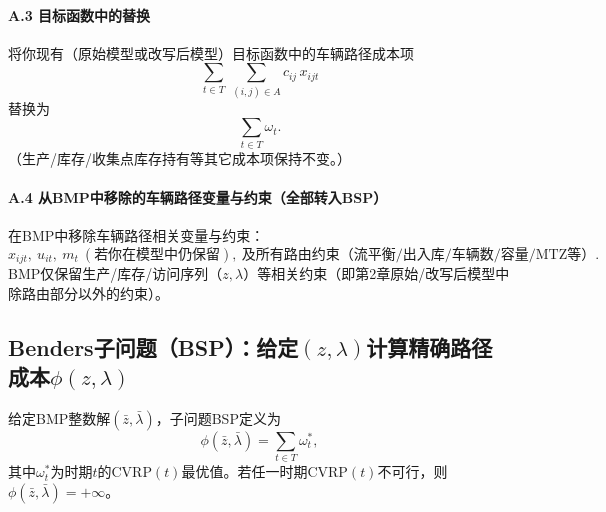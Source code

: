 \documentclass{article}
\begin{document}
\paragraph{A.3 目标函数中的替换}
将你现有（原始模型或改写后模型）目标函数中的车辆路径成本项
\[
\sum_{t\in T}\ \sum_{(i,j)\in A} c_{ij}\,x_{ijt}
\]
替换为
\[
\sum_{t\in T}\omega_t .
\]
（生产/库存/收集点库存持有等其它成本项保持不变。）

\paragraph{A.4 从BMP中移除的车辆路径变量与约束（全部转入BSP）}
在BMP中移除车辆路径相关变量与约束：
\[
x_{ijt},\ u_{it},\ m_t\ (\text{若你在模型中仍保留}),\ \text{及所有路由约束（流平衡/出入库/车辆数/容量/MTZ等）}.
\]
BMP仅保留生产/库存/访问序列（$z,\lambda$）等相关约束（即第2章原始/改写后模型中除路由部分以外的约束）。

\subsection{Benders子问题（BSP）：给定$(z,\lambda)$计算精确路径成本$\phi(z,\lambda)$}

给定BMP整数解$(\bar z,\bar\lambda)$，子问题BSP定义为
\begin{equation}
\phi(\bar z,\bar\lambda)=\sum_{t\in T}\omega_t^*,
\end{equation}
其中$\omega_t^*$为时期$t$的CVRP$(t)$最优值。若任一时期CVRP$(t)$不可行，则$\phi(\bar z,\bar\lambda)=+\infty$。
\end{document}
